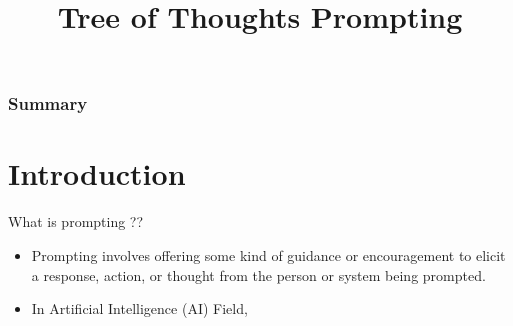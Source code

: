 \documentclass[aspectratio=169, xcolor={dvipsnames}, 10pt, brazil]{beamer}
\title[]{Tree of Thoughts Prompting}
\institute[]{Department of Computer Science and Engineering,BUET}
\date{}
\begin{document}
\begin{frame}
    \titlepage
\end{frame}


\begin{frame}[t]
    \frametitle{Summary }
     \tableofcontents
\end{frame}

\section{Introduction}

\begin{frame}{What is prompting ??}

    \begin{itemize}
		\item Prompting involves offering some kind of guidance or encouragement to elicit a response, action, or thought from the person or system being prompted.
	\item \textcolor{gray!120}{ In Artificial Intelligence        (AI) Field,}
	\end{itemize}
\end{frame}
\end{document}
